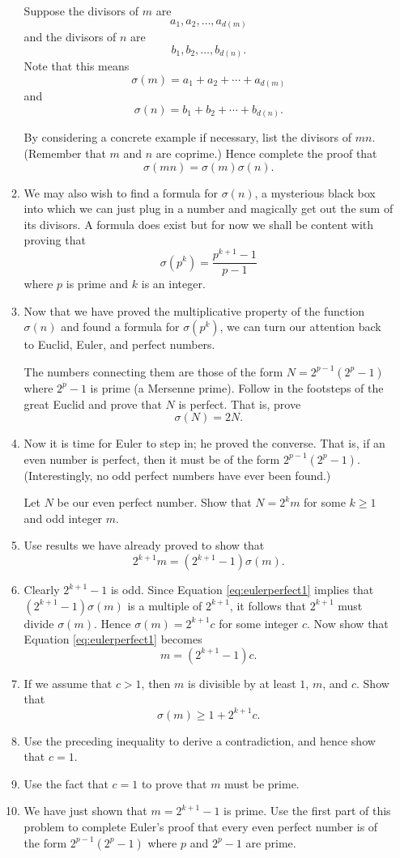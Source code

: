 \documentclass[a4paper,10pt]{article}
\begin{document}
\begin{enumerate}
\begin{enumerate}
  Suppose the divisors of \(m\) are \[a_1,a_2,\ldots,a_{d(m)}\] and the divisors of \(n\) are \[b_1,b_2,\ldots,b_{d(n)}.\]
  Note that this means \[\sigma(m)=a_1+a_2+\cdots+a_{d(m)}\] and \[\sigma(n)=b_1+b_2+\cdots+b_{d(n)}.\]
  
  By considering a concrete example if necessary, list the divisors of \(mn\). (Remember that \(m\) and \(n\) are coprime.)
  Hence complete the proof that \[\sigma(mn)=\sigma(m)\sigma(n).\]
\item We may also wish to find a formula for \(\sigma(n)\), a mysterious black box into which we can just plug in a number and magically
  get out the sum of its divisors. A formula does exist but for now we shall be content with proving
  that \[\sigma(p^k)=\frac{p^{k+1}-1}{p-1}\] where \(p\) is prime and \(k\) is an integer.
\item Now that we have proved the multiplicative property of the function \(\sigma(n)\) and found a formula
  for \(\sigma(p^k)\), we can turn our attention back to
  Euclid, Euler, and perfect numbers.

  The numbers connecting them are those of the form \(N=2^{p-1}(2^p-1)\) where \(2^p-1\) is prime (a Mersenne prime).
  Follow in the footsteps of the great Euclid and prove that \(N\) is perfect. That is, prove \[\sigma(N)=2N.\]
\item Now it is time for Euler to step in; he proved the converse. That is, if an even number is perfect, then it must be of
  the form \(2^{p-1}(2^p-1)\). (Interestingly, no odd perfect numbers have ever been found.)
  
  Let \(N\) be our even perfect number. Show that \(N=2^km\) for some \(k\ge 1\) and odd integer \(m\).
\item Use results we have already proved to show that
  \begin{equation}\label{eq:eulerperfect1}
  2^{k+1}m=(2^{k+1}-1)\sigma(m).
    \end{equation}
  \item Clearly \(2^{k+1}-1\) is odd. Since Equation \eqref{eq:eulerperfect1} implies that \((2^{k+1}-1)\sigma(m)\) is a multiple of \(2^{k+1}\), it
    follows that \(2^{k+1}\) must divide \(\sigma(m)\). Hence \(\sigma(m)=2^{k+1}c\) for some integer \(c\). Now show that Equation \eqref{eq:eulerperfect1}
    becomes \[m=(2^{k+1}-1)c.\]
  \item If we assume that \(c>1\), then \(m\) is divisible by at least \(1\), \(m\), and \(c\). Show that \[\sigma(m)\ge1+2^{k+1}c.\]
  \item Use the preceding inequality to derive a contradiction, and hence show that \(c=1\).
  \item Use the fact that \(c=1\) to prove that \(m\) must be prime.
  \item    We have just shown that \(m=2^{k+1}-1\) is prime. Use the first part of this problem to complete Euler's proof that every even perfect
    number is of the form \(2^{p-1}(2^p-1)\) where \(p\) and \(2^p-1\) are prime.
\end{enumerate}


\end{enumerate}
\end{document}
